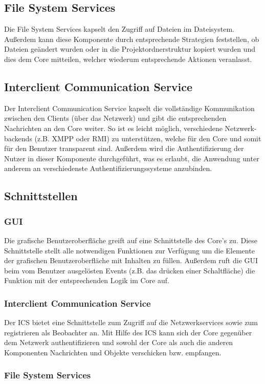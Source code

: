\subsection{File System Services}
Die File System Services kapselt den Zugriff auf Dateien im Dateisystem. Außerdem kann diese Komponente durch entsprechende Strategien feststellen, ob Dateien geändert wurden oder in die Projektordnerstruktur kopiert wurden und dies dem Core mitteilen, welcher wiederum entsprechende Aktionen veranlasst.

\subsection{Interclient Communication Service} 
Der Interclient Communication Service kapselt die vollständige Kommunikation zwischen den Clients (über das Netzwerk) und gibt die entsprechenden Nachrichten an den Core weiter. So ist es leicht möglich, verschiedene Netzwerk-backends (z.B. XMPP oder RMI) zu unterstützen, welche für den Core und somit für den Benutzer transparent sind. Außerdem wird die Authentifizierung der Nutzer in dieser Komponente durchgeführt, was es erlaubt, die Anwendung unter anderem an verschiedenste Authentifizierungssysteme anzubinden. 

\subsection{Schnittstellen}

\subsubsection{GUI}
Die grafische Benutzeroberfläche greift auf eine Schnittstelle des Core's zu. Diese Schnittstelle stellt alle notwendigen Funktionen zur Verfügung um die Elemente der grafischen Benutzeroberfläche mit Inhalten zu füllen. Außerdem ruft die GUI beim vom Benutzer ausgelösten Events (z.B. das drücken einer Schaltfläche) die Funktion mit der entsprechenden Logik im Core auf. 

\subsubsection{Interclient Communication Service}
Der ICS bietet eine Schnittstelle zum Zugriff auf die Netzwerkservices sowie zum registrieren als Beobachter an. Mit Hilfe des ICS kann sich der Core gegenüber dem Netzwerk authentifizieren und sowohl der Core als auch die anderen Komponenten Nachrichten und Objekte verschicken bzw. empfangen. 

\subsubsection{File System Services}

